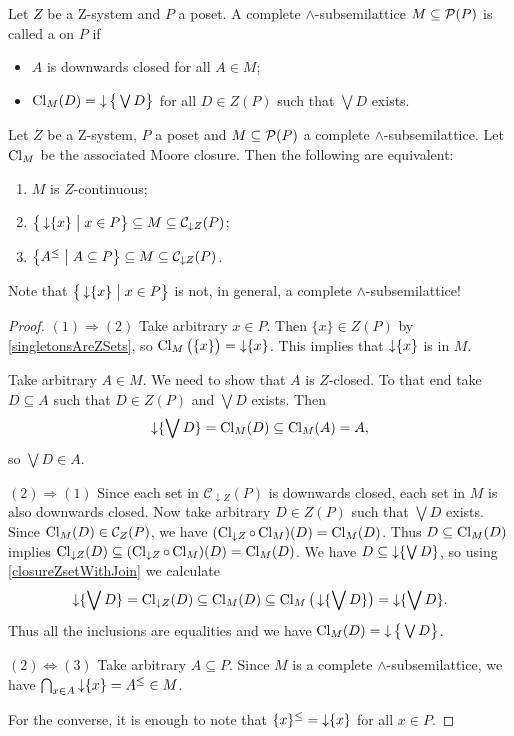 \begin{definition}
Let $Z$ be a $\mathrm{Z}$-system and $P$ a poset. A complete $\wedge$-subsemilattice $M\subseteq \operatorname{\mathcal{P}}(P)$ is called a  on $P$ if
\begin{itemize}
\item $A$ is downwards closed for all $A\in M$;
\item $\operatorname{Cl}_{M}(D) = \operatorname{\downarrow}\big\{\bigvee D\big\}$ for all $D\in Z(P)$ such that $\bigvee D$ exists.
\end{itemize}
\end{definition}

\begin{proposition} \label{ZcontinuityIntersectionSystem}
Let $Z$ be a $\mathrm{Z}$-system, $P$ a poset and $M \subseteq \operatorname{\mathcal{P}}(P)$ a complete $\wedge$-subsemilattice. Let $\operatorname{Cl}_{M}$ be the associated Moore closure. Then the following are equivalent:
\begin{enumerate}
\item $M$ is $Z$-continuous;
\item $\setbuilder[\big]{\downset\{x\}}{x\in P} \subseteq M \subseteq \mathcal{C}_{\downarrow Z}(P)$;
\item $\setbuilder{A^\leq}{A\subseteq P} \subseteq M \subseteq \mathcal{C}_{\downarrow Z}(P)$.
\end{enumerate}
\end{proposition}
Note that $\setbuilder[\big]{\downset\{x\}}{x\in P}$ is not, in general, a complete $\wedge$-subsemilattice! 
\begin{proof}
$(1) \Rightarrow (2)$ Take arbitrary $x\in P$. Then $\{x\}\in Z(P)$ by \ref{singletonsAreZSets}, so $\operatorname{Cl}_{M}\big(\{x\}\big) = \operatorname{\downarrow}\{x\}$. This implies that $\operatorname{\downarrow}\{x\}$ is in $M$.

Take arbitrary $A\in M$. We need to show that $A$ is $Z$-closed. To that end take $D\subseteq A$ such that $D\in Z(P)$ and $\bigvee D$ exists. Then
\[ \operatorname{\downarrow}\{\bigvee D\} = \operatorname{Cl}_{M}(D) \subseteq \operatorname{Cl}_{M}(A) = A, \]
so $\bigvee D \in A$.

$(2) \Rightarrow (1)$ Since each set in $\mathcal{C}_{\downarrow Z}(P)$ is downwards closed, each set in $M$ is also downwards closed. Now take arbitrary $D\in Z(P)$ such that $\bigvee D$ exists. Since $\operatorname{Cl}_{M}(D) \in \mathcal{C}_Z(P)$, we have $(\operatorname{Cl}_{\downarrow Z}\circ \operatorname{Cl}_{M})(D) = \operatorname{Cl}_{M}(D)$. Thus $D\subseteq \operatorname{Cl}_{M}(D)$ implies $\operatorname{Cl}_{\downarrow Z}(D) \subseteq (\operatorname{Cl}_{\downarrow Z}\circ \operatorname{Cl}_{M})(D) = \operatorname{Cl}_{M}(D)$. We have $D\subseteq \operatorname{\downarrow}\{\bigvee D\}$, so using \ref{closureZsetWithJoin} we calculate
\[ \operatorname{\downarrow}\{\bigvee D\} = \operatorname{Cl}_{\downarrow Z}(D) \subseteq \operatorname{Cl}_{M}(D) \subseteq \operatorname{Cl}_{M}\big(\operatorname{\downarrow} \{\bigvee D\}\big) = \operatorname{\downarrow}\{\bigvee D\}. \]
Thus all the inclusions are equalities and we have $\operatorname{Cl}_{M}(D) = \operatorname{\downarrow}\big\{\bigvee D\big\}$.

$(2) \Leftrightarrow (3)$ Take arbitrary $A\subseteq P$. Since $M$ is a complete $\wedge$-subsemilattice, we have $\bigcap_{x\in A}\operatorname{\downarrow}\{x\} = A^\leq \in M$.

For the converse, it is enough to note that $\{x\}^\leq = \operatorname{\downarrow}\{x\}$ for all $x\in P$.
\end{proof}
